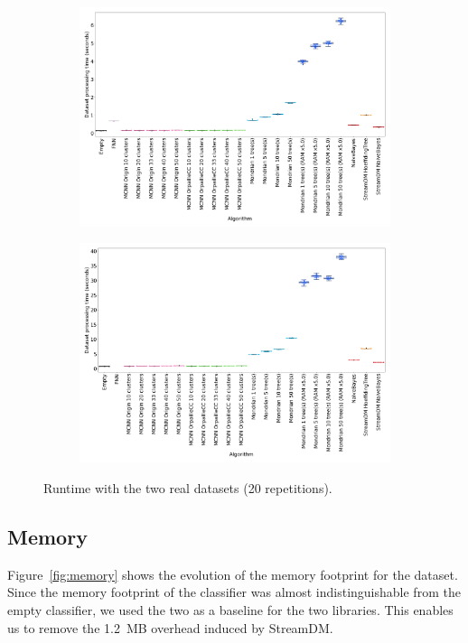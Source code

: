 \begin{figure}
	\begin{subfigure}[t]{.49\linewidth}
		\includegraphics[width=\linewidth]{figures/results/banos_6_runtime.png}
		\caption{\banosdataset}
		\label{fig:runtime-banos}
	\end{subfigure}
	\hfill
	\begin{subfigure}[t]{.49\linewidth}
		\includegraphics[width=\linewidth]{figures/results/recofit_6_runtime.png}
		\caption{\recofitdataset}
		\label{fig:runtime-recofit}
	\end{subfigure}
	\caption{Runtime with the two real datasets (20 repetitions).}
	\label{fig:runtime}
\end{figure}

\subsection{Memory}
\label{sec:result-memory}
Figure~\ref{fig:memory} shows the evolution of the memory footprint for the
\banosdataset dataset. Since the  memory footprint of the \naivebayes classifier was
almost indistinguishable from the empty classifier, we used the two \naivebayes
as a baseline for the two libraries. This enables us to remove the 1.2~MB overhead
induced by StreamDM.

